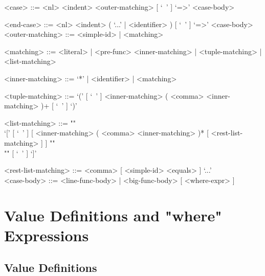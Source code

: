 \documentclass[diploma]{softlab-thesis}
\begin{document}
\begin{itemize}
\begin{grammar}
<case> ::=  <nl> <indent> <outer-matching> [ `\ ' ] `=>' <case-body>

<end-case> ::=
<nl> <indent> ( `...' | <identifier> ) [ `\ ' ] `=>' <case-body>
\\

<outer-matching> ::= <simple-id> | <matching>

<matching> ::=
<literal> | <pre-func> <inner-matching> | <tuple-matching> | <list-matching>

<inner-matching> ::= `*' | <identifier> | <matching>

<tuple-matching> ::=
`(' [ `\ ' ] <inner-matching> ( <comma> <inner-matching> )+ [ `\ ' ] `)'

<list-matching> ::= ""\\
`[' [ `\ ' ]
[ <inner-matching> ( <comma> <inner-matching> )* [ <rest-list-matching> ] ]
""\\""
[ `\ ' ] `]'

<rest-list-matching> ::= <comma> [ <simple-id> <equals> ] `...'
\\

<case-body> ::= <line-func-body> | <big-func-body> [ <where-expr> ]
\end{grammar}

\end{itemize}

\newpage

\section{Value Definitions and "where" Expressions}
\label{subsec:valdefswhere}

\subsection{Value Definitions}
\label{subsubsec:valdefs}
\end{document}
